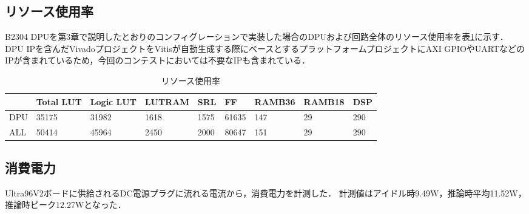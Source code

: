 \subsection{リソース使用率}
B2304 DPUを第3章で説明したとおりのコンフィグレーションで実装した場合のDPUおよび回路全体のリソース使用率を表\ref{resource_util}に示す．
DPU IPを含んだVivadoプロジェクトをVitisが自動生成する際にベースとするプラットフォームプロジェクトにAXI GPIOやUARTなどのIPが含まれているため，今回のコンテストにおいては不要なIPも含まれている．

\begin{table}[b]
    \begin{center}
        \label{resource_util}
        \caption{リソース使用率}
        \begin{tabular}{lllllllll}
            & Total LUT & Logic LUT & LUTRAM & SRL  & FF    & RAMB36 & RAMB18 & DSP \\ \hline
        DPU & 35175     & 31982     & 1618   & 1575 & 61635 & 147    & 29     & 290 \\ \hline
        ALL & 50414     & 45964     & 2450   & 2000 & 80647 & 151    & 29     & 290
        \end{tabular}
    \end{center}
\end{table}
\subsection{消費電力}
Ultra96V2ボードに供給されるDC電源プラグに流れる電流から，消費電力を計測した．
計測値はアイドル時9.49W，推論時平均11.52W，推論時ピーク12.27Wとなった．